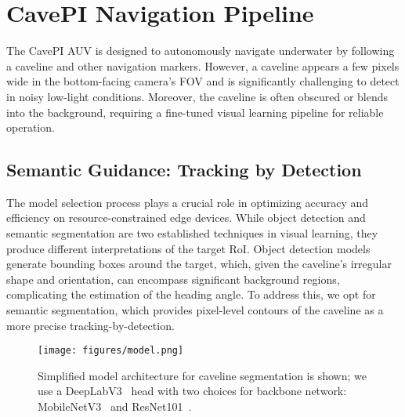 \section{CavePI Navigation Pipeline}
The CavePI AUV is designed to autonomously navigate underwater by following a caveline and other navigation markers. However, a caveline appears a few pixels wide in the bottom-facing camera’s FOV and is significantly challenging to detect in noisy low-light conditions. Moreover, the caveline is often obscured or blends into the background, requiring a fine-tuned visual learning pipeline for reliable operation. 

\subsection{Semantic Guidance: Tracking by Detection}
The model selection process plays a crucial role in optimizing accuracy and efficiency on resource-constrained edge devices. While object detection and semantic segmentation are two established techniques in visual learning, they produce different interpretations of the target RoI. Object detection models generate bounding boxes around the target, which, given the caveline's irregular shape and orientation, can encompass significant background regions, complicating the estimation of the heading angle. To address this, we opt for semantic segmentation, which provides pixel-level contours of the caveline as a more precise tracking-by-detection.

\begin{figure}[h]
    \centering
    \texttt{[image: figures/model.png]}%
    \vspace{-1mm}
    \caption{Simplified model architecture for caveline segmentation is shown; we use a DeepLabV3~\cite{chen2017deeplab} head with two choices for backbone network: MobileNetV3~\cite{howard2019searching} and ResNet101~\cite{he2016deep}.}
    \label{fig:model}
    \vspace{-3mm}
\end{figure}


